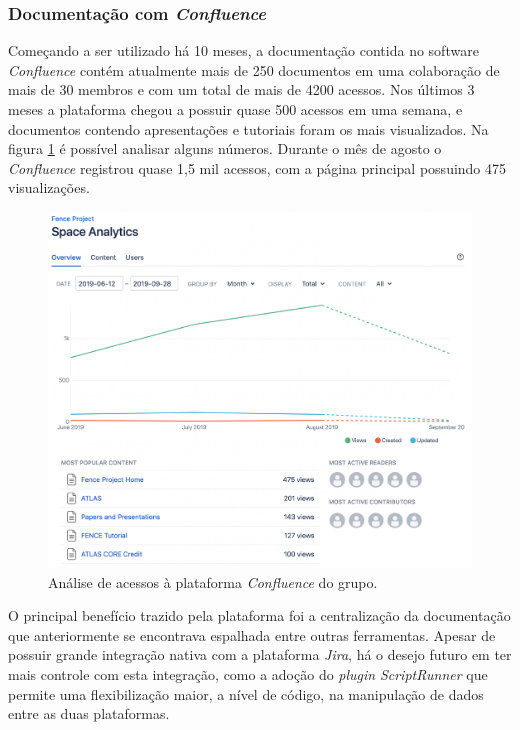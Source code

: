\hypertarget{documentacao-com-confluence}{%
\subsubsection{\texorpdfstring{Documentação com \emph{Confluence}}{Documentação com Confluence}}\label{documentacao-com-confluence}}

Começando a ser utilizado há 10 meses, a documentação contida no software \emph{Confluence} contém atualmente mais de 250 documentos em uma colaboração de mais de 30 membros e com um total de mais de 4200 acessos. Nos últimos 3 meses a plataforma chegou a possuir quase 500 acessos em uma semana, e documentos contendo apresentações e tutoriais foram os mais visualizados. Na figura \ref{fig:space-analytics} é possível analisar alguns números. Durante o mês de agosto o \emph{Confluence} registrou quase 1,5 mil acessos, com a página principal possuindo 475 visualizações.

\begin{figure}[H]
    \centering
    \includegraphics[width=15cm]{source/5-resultados/images/space-analytics-censored.png}
    \caption{Análise de acessos à plataforma \emph{Confluence} do grupo.}
    \label{fig:space-analytics}
\end{figure}

O principal benefício trazido pela plataforma foi a centralização da documentação que anteriormente se encontrava espalhada entre outras ferramentas. Apesar de possuir grande integração nativa com a plataforma \emph{Jira}, há o desejo futuro em ter mais controle com esta integração, como a adoção do \emph{plugin} \emph{ScriptRunner} que permite uma flexibilização maior, a nível de código, na manipulação de dados entre as duas plataformas.

